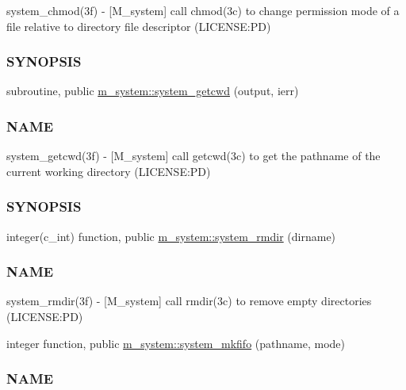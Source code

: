 \begin{DoxyCompactItemize}
\begin{DoxyCompactList}
system\+\_\+chmod(3f) -\/ \mbox{[}M\+\_\+system\mbox{]} call chmod(3c) to change permission mode of a file relative to directory file descriptor (L\+I\+C\+E\+N\+SE\+:PD) \subsubsection*{S\+Y\+N\+O\+P\+S\+IS}\end{DoxyCompactList}\item 
subroutine, public \mbox{\hyperlink{namespacem__system_a5a32db818a9ffb0a4ea724e95356c560}{m\+\_\+system\+::system\+\_\+getcwd}} (output, ierr)
\begin{DoxyCompactList}\small\item\em \subsubsection*{N\+A\+ME}

system\+\_\+getcwd(3f) -\/ \mbox{[}M\+\_\+system\mbox{]} call getcwd(3c) to get the pathname of the current working directory (L\+I\+C\+E\+N\+SE\+:PD) \subsubsection*{S\+Y\+N\+O\+P\+S\+IS}\end{DoxyCompactList}\item 
integer(c\+\_\+int) function, public \mbox{\hyperlink{namespacem__system_a21fd3e1ccd50cef6adc539ef3d7a9836}{m\+\_\+system\+::system\+\_\+rmdir}} (dirname)
\begin{DoxyCompactList}\small\item\em \subsubsection*{N\+A\+ME}

system\+\_\+rmdir(3f) -\/ \mbox{[}M\+\_\+system\mbox{]} call rmdir(3c) to remove empty directories (L\+I\+C\+E\+N\+SE\+:PD) \end{DoxyCompactList}\item 
integer function, public \mbox{\hyperlink{namespacem__system_ab2d95258ee26b85a0283538880775475}{m\+\_\+system\+::system\+\_\+mkfifo}} (pathname, mode)
\begin{DoxyCompactList}\small\item\em \subsubsection*{N\+A\+ME}


\end{DoxyCompactList}
\end{DoxyCompactItemize}

